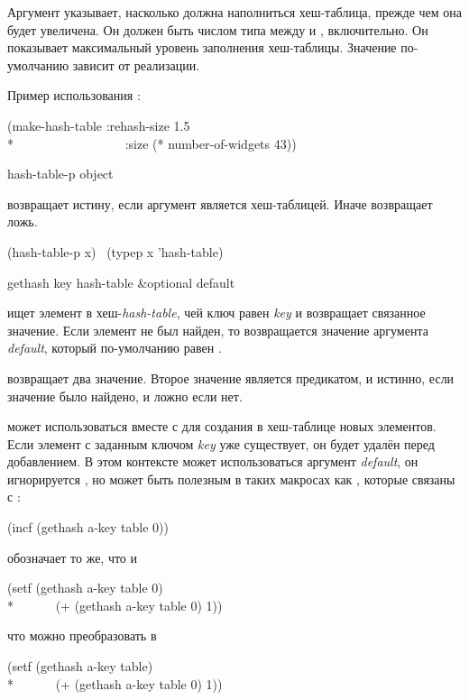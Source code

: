 \begin{defun}[Функция]
Аргумент  указывает, насколько должна наполниться
хеш-таблица, прежде чем она будет увеличена. Он должен быть числом типа
 между  и , включительно.
Он показывает максимальный уровень заполнения хеш-таблицы.
Значение по-умолчанию зависит от реализации.

Пример использования :
\begin{lisp}
(make-hash-table :rehash-size 1.5 \\*
~~~~~~~~~~~~~~~~~:size (* number-of-widgets 43))
\end{lisp}
\end{defun}

\begin{defun}[Функция]
hash-table-p object

 возвращает истину, если аргумент является хеш-таблицей. Иначе
возвращает ложь.
\begin{lisp}
(hash-table-p x) \EQ\ (typep x 'hash-table)
\end{lisp}
\end{defun}

\begin{defun}[Функция]
gethash key hash-table &optional default

 ищет элемент в хеш-\emph{hash-table}, чей ключ равен \emph{key} и
возвращает связанное значение. Если элемент не был найден, то возвращается
значение аргумента \emph{default}, который по-умолчанию равен {\false}.

 возвращает два значение. Второе значение является предикатом, и
истинно, если значение было найдено, и ложно если нет.

 может использоваться вместе с  для создания в
хеш-таблице новых элементов. Если элемент с заданным ключом \emph{key} уже
существует, он будет удалён перед добавлением. В этом контексте может
использоваться аргумент \emph{default}, он игнорируется , но может
быть полезным в таких макросах как , которые связаны с :
\begin{lisp}
(incf (gethash a-key table 0))
\end{lisp}
обозначает то же, что и 
\begin{lisp}
(setf (gethash a-key table 0) \\*
~~~~~~(+ (gethash a-key table 0) 1))
\end{lisp}
что можно преобразовать в
\begin{lisp}
(setf (gethash a-key table) \\*
~~~~~~(+ (gethash a-key table 0) 1))
\end{lisp}
\end{defun}

